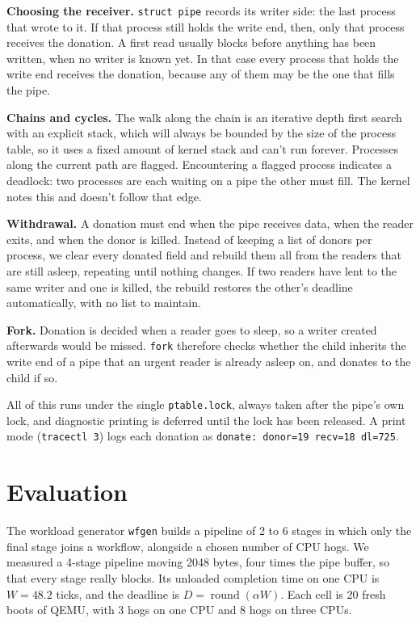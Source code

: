 \documentclass[10pt,a4paper]{article}
\newcommand{\code}[1]{\texttt{#1}}
\begin{document}
\textbf{Choosing the receiver.} \code{struct pipe} records its writer side: the last process that wrote to it. If that process still holds the write end, then, only that process receives the donation. A first read usually blocks before anything has been written, when no writer is known yet. In that case every process that holds the write end receives the donation, because any of them may be the one that fills the pipe.

\textbf{Chains and cycles.} The walk along the chain is an iterative depth first search with an explicit stack, which will always be bounded by the size of the process table, so it uses a fixed amount of kernel stack and can't run forever. Processes along the current path are flagged. Encountering a flagged process indicates a deadlock: two processes are each waiting on a pipe the other must fill. The kernel notes this and doesn't follow that edge.

\textbf{Withdrawal.} A donation must end when the pipe receives data, when the reader exits, and when the donor is killed. Instead of keeping a list of donors per process, we clear every donated field and rebuild them all from the readers that are still asleep, repeating until nothing changes. If two readers have lent to the same writer and one is killed, the rebuild restores the other's deadline automatically, with no list to maintain.

\textbf{Fork.} Donation is decided when a reader goes to sleep, so a writer created afterwards would be missed. \code{fork} therefore checks whether the child inherits the write end of a pipe that an urgent reader is already asleep on, and donates to the child if so.

All of this runs under the single \code{ptable.lock}, always taken after the pipe's own lock, and diagnostic printing is deferred until the lock has been released. A print mode (\code{tracectl 3}) logs each donation as \code{donate: donor=19 recv=18 dl=725}.

\section{Evaluation}

The workload generator \code{wfgen} builds a pipeline of 2 to 6 stages in which only the final stage joins a workflow, alongside a chosen number of CPU hogs. We measured a 4-stage pipeline moving 2048 bytes, four times the pipe buffer, so that every stage really blocks. Its unloaded completion time on one CPU is $W = 48.2$ ticks, and the deadline is $D = \operatorname{round}(\alpha W)$. Each cell is 20 fresh boots of QEMU, with 3 hogs on one CPU and 8 hogs on three CPUs.
\end{document}
